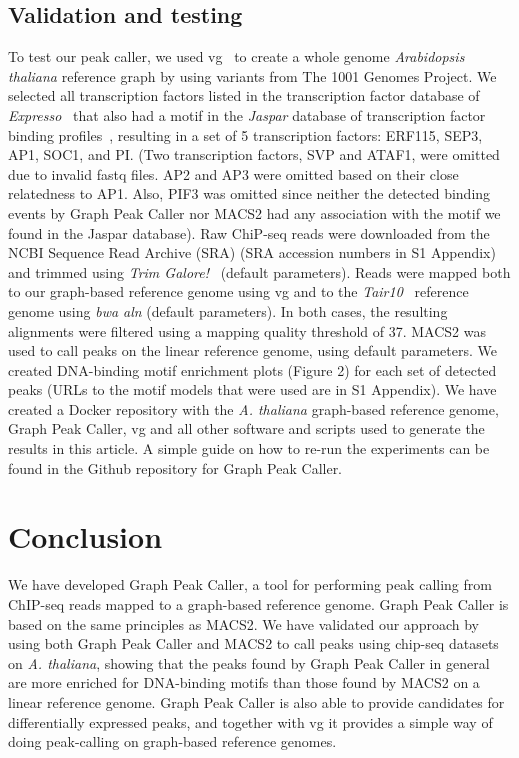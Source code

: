 \documentclass[10pt,letterpaper]{article}
\begin{document}
\subsection*{Validation and testing}
To test our peak caller, we used vg~\cite{vg} to create a whole genome \emph{Arabidopsis thaliana} reference graph by using variants from The 1001 Genomes Project. We selected all transcription factors listed in the transcription factor database of \emph{Expresso}~\cite{expresso} that also had a motif in the \emph{Jaspar} database of transcription factor binding profiles~\cite{jaspar}, resulting in a set of 5 transcription factors: ERF115, SEP3, AP1, SOC1, and PI. (Two transcription factors, SVP and ATAF1, were omitted due to invalid fastq files. AP2 and AP3 were omitted based on their close relatedness to AP1. Also, PIF3 was omitted since neither the detected binding events by Graph Peak Caller nor MACS2 had any association with the motif we found in the Jaspar database). Raw ChiP-seq reads were downloaded from the NCBI Sequence Read Archive (SRA) (SRA accession numbers in S1 Appendix) and trimmed using \emph{Trim Galore!}~\cite{trim_galore} (default parameters). Reads were mapped both to our graph-based reference genome using vg and to the \emph{Tair10}~\cite{tair} reference genome using \emph{bwa aln} (default parameters). In both cases, the resulting alignments were filtered using a mapping quality threshold of 37. MACS2 was used to call peaks on the linear reference genome, using default parameters. We created DNA-binding motif enrichment plots (Figure 2) for each set of detected peaks (URLs to the motif models that were used are in S1 Appendix). We have created a Docker repository with the \emph{A. thaliana} graph-based reference genome, Graph Peak Caller, vg and all other software and scripts used to generate the results in this article. A simple guide on how to re-run the experiments can be found in the Github repository for Graph Peak Caller.

\section*{Conclusion}
We have developed Graph Peak Caller, a tool for performing peak calling from ChIP-seq reads mapped to a graph-based reference genome. Graph Peak Caller is based on the same principles as MACS2. We have validated our approach by using both Graph Peak Caller and MACS2 to call peaks using chip-seq datasets on \emph{A. thaliana}, showing that the peaks found by Graph Peak Caller in general are more enriched for DNA-binding motifs than those found by MACS2 on a linear reference genome. Graph Peak Caller is also able to provide candidates for differentially expressed peaks, and together with vg it provides a simple way of doing peak-calling on graph-based reference genomes.
\end{document}
